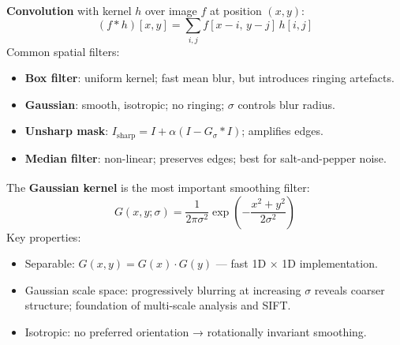 \begin{tcbitemize}[ skin=sectionraster ]
    \tcbitem[title={Spatial Filtering and Convolution}, raster multicolumn=3]
    \textbf{Convolution} with kernel $h$ over image $f$ at position $(x,y)$\textsuperscript{\cite[][pp.~120--132]{gonzalezWoods2018}}:
    \begin{equation}
        (f * h)[x,y] = \sum_{i,j} f[x-i,\, y-j]\, h[i,j]
    \end{equation}
    Common spatial filters:
    \begin{itemize}
        \item \textbf{Box filter}: uniform kernel; fast mean blur, but introduces ringing artefacts.
        \item \textbf{Gaussian}: smooth, isotropic; no ringing; $\sigma$ controls blur radius.
        \item \textbf{Unsharp mask}: $I_{\text{sharp}} = I + \alpha(I - G_\sigma * I)$; amplifies edges.
        \item \textbf{Median filter}: non-linear; preserves edges; best for salt-and-pepper noise.
    \end{itemize}

    \tcbitem[title={Gaussian Blur}, raster multicolumn=3]
    The \textbf{Gaussian kernel} is the most important smoothing filter\textsuperscript{\cite[][pp.~138--142]{jahneDigitalImageProcessing2005}}:
    \begin{equation}
        G(x,y;\sigma) = \frac{1}{2\pi\sigma^2} \exp\!\left(-\frac{x^2+y^2}{2\sigma^2}\right)
    \end{equation}
    Key properties:
    \begin{itemize}
        \item Separable: $G(x,y) = G(x)\cdot G(y)$ — fast 1D × 1D implementation.
        \item Gaussian scale space: progressively blurring at increasing $\sigma$ reveals coarser structure; foundation of multi-scale analysis and SIFT.
        \item Isotropic: no preferred orientation → rotationally invariant smoothing.
    \end{itemize}


\end{tcbitemize}
